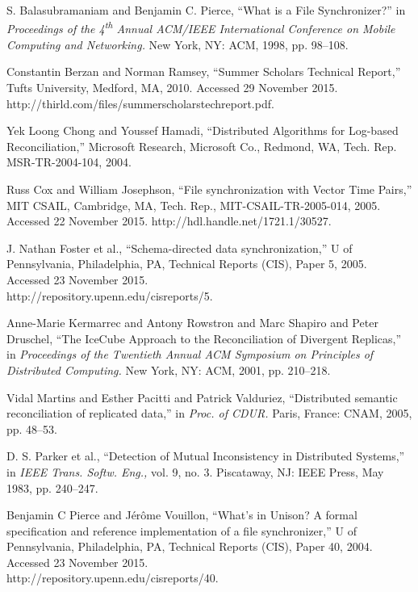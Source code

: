 
S. Balasubramaniam and Benjamin C. Pierce,
``What is a File Synchronizer?''
in \emph{Proceedings of the 4\textsuperscript{th} Annual 
ACM/IEEE International Conference on Mobile Computing and Networking.}
New York, NY: ACM, 1998, pp. 98--108.

Constantin Berzan and Norman Ramsey,
``Summer Scholars Technical Report,''
Tufts University, Medford, MA, 2010.
Accessed 29 November 2015.
http://thirld.com/files/summerscholars\undersc techreport.pdf.

Yek Loong Chong and Youssef Hamadi,
``Distributed Algorithms for Log-based Reconciliation,''
Microsoft Research, Microsoft Co., Redmond, WA,
Tech. Rep. MSR-TR-2004-104, 2004.

Russ Cox and William Josephson,
``File synchronization with Vector Time Pairs,''
MIT CSAIL, Cambridge, MA, 
Tech. Rep., MIT-CSAIL-TR-2005-014, 2005.
Accessed 22 November 2015.
http://hdl.handle.net/1721.1/30527.

J. Nathan Foster et al.,
``Schema-directed data synchronization,''
U of Pennsylvania,
Philadelphia, PA,
Technical Reports (CIS),
Paper 5,
2005.
Accessed 23 November 2015.\\
http://repository.upenn.edu/cis\undersc reports/5.

Anne-Marie Kermarrec and Antony Rowstron and Marc Shapiro and Peter Druschel,
``The IceCube Approach to the Reconciliation of Divergent Replicas,''
in \emph{Proceedings of the Twentieth Annual ACM Symposium on Principles of Distributed Computing.}
New York, NY: ACM, 2001, pp. 210--218.

Vidal Martins and Esther Pacitti and Patrick Valduriez,
``Distributed semantic reconciliation of replicated data,''
in \emph{Proc. of CDUR.}
Paris, France: CNAM,
2005,
pp. 48--53.

D. S. Parker et al.,
``Detection of Mutual Inconsistency in Distributed Systems,''
in \emph{IEEE Trans. Softw. Eng.,}
vol. 9, no. 3.
Piscataway, NJ: IEEE Press,
May 1983,
pp. 240--247.

Benjamin C Pierce and J{\'e}r{\^o}me Vouillon,
``What's in Unison? A formal specification and reference implementation of a file synchronizer,''
U of Pennsylvania,
Philadelphia, PA,
Technical Reports (CIS),
Paper 40,
2004.
Accessed 23 November 2015.\\
http://repository.upenn.edu/cis\undersc reports/40.


